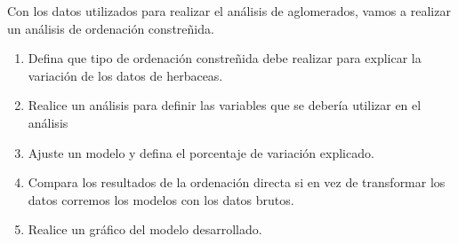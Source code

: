 \documentclass[]{book}
\begin{document}
Con los datos utilizados para realizar el análisis de aglomerados, vamos
a realizar un análisis de ordenación constreñida.

\begin{enumerate}
\def\labelenumi{\alph{enumi}.}
\item
  Defina que tipo de ordenación constreñida debe realizar para explicar
  la variación de los datos de herbaceas.
\item
  Realice un análisis para definir las variables que se debería utilizar
  en el análisis
\item
  Ajuste un modelo y defina el porcentaje de variación explicado.
\item
  Compara los resultados de la ordenación directa si en vez de
  transformar los datos corremos los modelos con los datos brutos.
\item
  Realice un gráfico del modelo desarrollado.
\end{enumerate}


\end{document}
